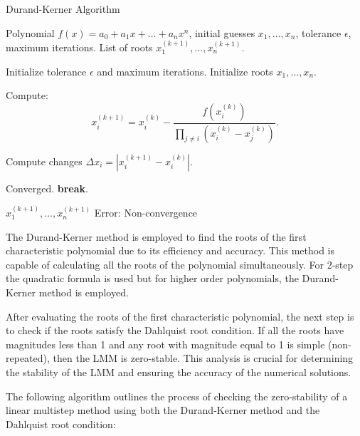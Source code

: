 \begin{algorithm}
   \caption{Durand-Kerner Algorithm}
   \label{alg:durand_kerner}
   
   \begin{algorithmic}
   \REQUIRE Polynomial \( f(x) = a_0 + a_1 x + \ldots + a_n x^n \), initial guesses \( x_1, \ldots, x_n \), tolerance \( \epsilon \), maximum iterations.
   \ENSURE List of roots \( x_1^{(k+1)}, \ldots, x_n^{(k+1)} \).
   
   \STATE Initialize tolerance \( \epsilon \) and maximum iterations.
   \STATE Initialize roots \( x_1, \ldots, x_n \).
   
           \STATE Compute:
           \[
           x_i^{(k+1)} = x_i^{(k)} - \frac{f(x_i^{(k)})}{\prod_{j \neq i} (x_i^{(k)} - x_j^{(k)})}.
           \]
       \ENDFOR
   
       \STATE Compute changes \( \Delta x_i = |x_i^{(k+1)} - x_i^{(k)}| \).
   
           \STATE Converged.
           \STATE \textbf{break}.
       \ENDIF
   
   \ENDFOR
   
       \RETURN \( x_1^{(k+1)}, \ldots, x_n^{(k+1)} \)
   \ELSE
       \RETURN Error: Non-convergence
   \ENDIF
   
   \end{algorithmic}
\end{algorithm}

\newpage
The Durand-Kerner method is employed to find the roots of the first characteristic polynomial due to its efficiency and accuracy. This method is capable of calculating all the roots of the polynomial simultaneously. For 2-step the quadratic formula is used but for higher order polynomials, the Durand-Kerner method is employed. 

After evaluating the roots of the first characteristic polynomial, the next step is to check if the roots satisfy the Dahlquist root condition. If all the roots have magnitudes less than 1 and any root with magnitude equal to 1 is simple (non-repeated), then the LMM is zero-stable. This analysis is crucial for determining the stability of the LMM and ensuring the accuracy of the numerical solutions.

The following algorithm outlines the process of checking the zero-stability of a linear multistep method using both the Durand-Kerner method and the Dahlquist root condition:

